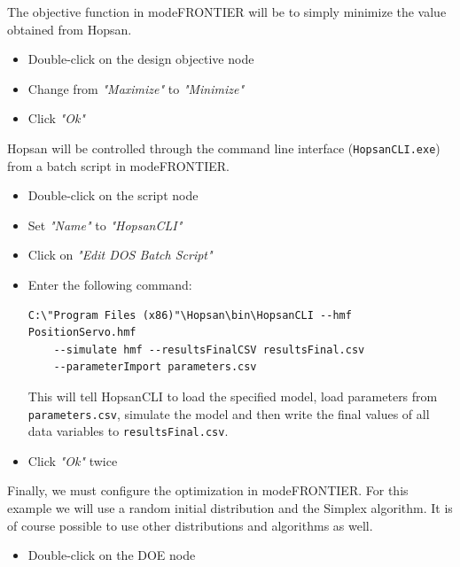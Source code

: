 \documentclass[a4paper]{article}
\begin{document}
\begin{tutenumerate}
The objective function in modeFRONTIER will be to simply minimize the value obtained from Hopsan.
\begin{itemize}
\item Double-click on the design objective node


\item Change from \textit{"Maximize"} to \textit{"Minimize"}
\item Click \textit{"Ok"}
\end{itemize}

\pagebreak

Hopsan will be controlled through the command line interface (\texttt{HopsanCLI.exe}) from a batch script in modeFRONTIER.
\begin{itemize}
\item Double-click on the script node


\item Set \textit{"Name"} to \textit{"HopsanCLI"}
\item Click on \textit{"Edit DOS Batch Script"}
\item Enter the following command:
\begin{lstlisting}[basicstyle=\footnotesize\ttfamily, breaklines=true]
C:\"Program Files (x86)"\Hopsan\bin\HopsanCLI --hmf PositionServo.hmf
    --simulate hmf --resultsFinalCSV resultsFinal.csv 
    --parameterImport parameters.csv
\end{lstlisting}
This will tell HopsanCLI to load the specified model, load parameters from \texttt{parameters.csv}, simulate the model and then write the final values of all data variables to \texttt{resultsFinal.csv}.
\item Click \textit{"Ok"} twice
\end{itemize}

Finally, we must configure the optimization in modeFRONTIER. For this example we will use a random initial distribution and the Simplex algorithm. It is of course possible to use other distributions and algorithms as well.
\begin{itemize}
\item Double-click on the DOE node


\end{itemize}
\end{tutenumerate}
\end{document}
